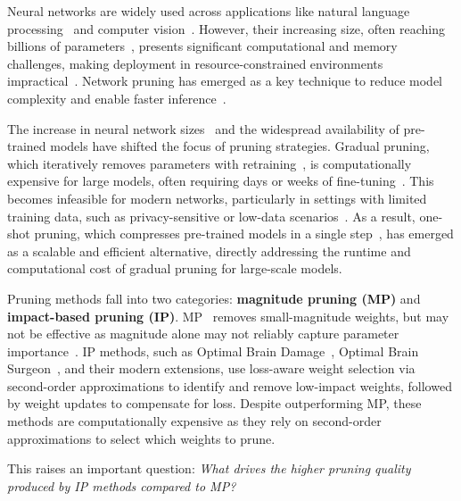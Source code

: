 Neural networks are widely used across applications like natural language processing~\cite{Transformers} and computer vision~\cite{alexnet, RESNET}. However, their increasing size, often reaching billions of parameters~\cite{Young2017RecentTI,ecoflap}, presents significant computational and memory challenges, making deployment in resource-constrained environments impractical~\cite{ZeRO}. Network pruning has emerged as a key technique to reduce model complexity and enable faster inference~\cite{SparseDNN, PruneFL, snip, GraSP, SynFlow}.

The increase in neural network sizes~\cite{Young2017RecentTI} and the widespread availability of pre-trained models have shifted the focus of pruning strategies. Gradual pruning, which iteratively removes parameters with retraining~\cite{late_training_gupta, Kusupati, gale2019state, RIGL}, is computationally expensive for large models, often requiring days or weeks of fine-tuning~\cite{CHITA}. This becomes infeasible for modern networks, particularly in settings with limited training data, such as privacy-sensitive or low-data scenarios~\cite{WoodFisher}. As a result, one-shot pruning, which compresses pre-trained models in a single step~\cite{WoodFisher, CBS, CHITA, wanda, SparseGPT}, has emerged as a scalable and efficient alternative, directly addressing the runtime and computational cost of gradual pruning for large-scale models.


Pruning methods fall into two categories: \textbf{magnitude pruning (MP)} and \textbf{impact-based pruning (IP)}. MP~\cite{Comparing_Biases, Using_Relevance, hanprune, gordon2020compressing} removes small-magnitude weights, but may not be effective as magnitude alone may not reliably capture parameter importance~\cite{CHITA}. IP methods, such as Optimal Brain Damage~\cite{brain_damage}, Optimal Brain Surgeon~\cite{brain_surgeon}, and their modern extensions, use loss-aware weight selection via second-order approximations to identify and remove low-impact weights, followed by weight updates to compensate for loss. Despite outperforming MP, these methods are computationally expensive as they rely on second-order approximations to select which weights to prune.




This raises an important question:
\textit{What drives the higher pruning quality produced by IP methods compared to MP?}

